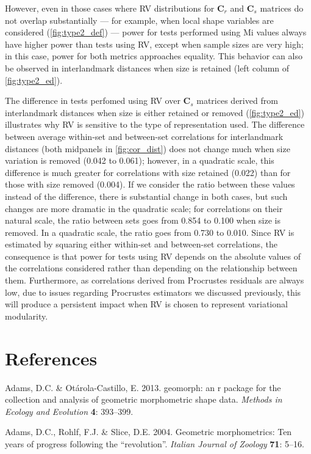 \documentclass[12pt,]{article}
\begin{document}
However, even in those cases where RV distributions for $\mathbf{C}_r$
and $\mathbf{C}_s$ matrices do not overlap substantially --- for
example, when local shape variables are considered
(\autoref{fig:type2_def}) --- power for tests performed using Mi values
always have higher power than tests using RV, except when sample sizes
are very high; in this case, power for both metrics approaches equality.
This behavior can also be observed in interlandmark distances when size
is retained (left column of \autoref{fig:type2_ed}).

The difference in tests perfomed using RV over $\mathbf{C}_s$ matrices
derived from interlandmark distances when size is either retained or
removed (\autoref{fig:type2_ed}) illustrates why RV is sensitive to the
type of representation used. The difference between average within-set
and between-set correlations for interlandmark distances (both midpanels
in \autoref{fig:cor_dist}) does not change much when size variation is
removed (0.042 to 0.061); however, in a quadratic scale, this difference
is much greater for correlations with size retained (0.022) than for
those with size removed (0.004). If we consider the ratio between these
values instead of the difference, there is substantial change in both
cases, but such changes are more dramatic in the quadratic scale; for
correlations on their natural scale, the ratio between sets goes from
0.854 to 0.100 when size is removed. In a quadratic scale, the ratio
goes from 0.730 to 0.010. Since RV is estimated by squaring either
within-set and between-set correlations, the consequence is that power
for tests using RV depends on the absolute values of the correlations
considered rather than depending on the relationship between them.
Furthermore, as correlations derived from Procrustes residuals are
always low, due to issues regarding Procrustes estimators we discussed
previously, this will produce a persistent impact when RV is chosen to
represent variational modularity.

\section*{References}\label{references}

Adams, D.C. \& Otárola-Castillo, E. 2013. geomorph: an r package for the
collection and analysis of geometric morphometric shape data.
\emph{Methods in Ecology and Evolution} \textbf{4}: 393--399.

Adams, D.C., Rohlf, F.J. \& Slice, D.E. 2004. Geometric morphometrics:
Ten years of progress following the ``revolution''. \emph{Italian
Journal of Zoology} \textbf{71}: 5--16.
\end{document}
